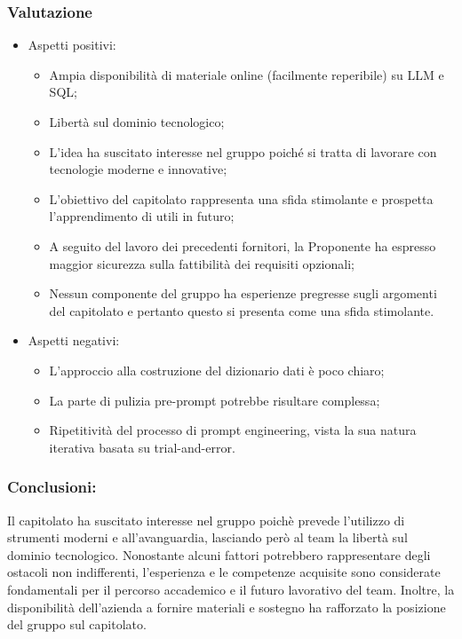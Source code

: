 \subsubsection{Valutazione}
\begin{itemize}
  \item Aspetti positivi:
  \begin{itemize}
    \item Ampia disponibilità di materiale online (facilmente reperibile) su LLM e SQL;
    \item Libertà sul dominio tecnologico;
    \item L’idea ha suscitato interesse nel gruppo poiché si tratta di lavorare con tecnologie moderne e innovative;
    \item L’obiettivo del capitolato rappresenta una sfida stimolante e prospetta l’apprendimento di  utili in futuro;
    \item A seguito del lavoro dei precedenti fornitori, la Proponente ha espresso maggior sicurezza sulla fattibilità dei requisiti opzionali;
    \item Nessun componente del gruppo ha esperienze pregresse sugli argomenti del capitolato e pertanto questo si presenta come una sfida stimolante.
  \end{itemize}
  \item Aspetti negativi:
  \begin{itemize}
    \item L’approccio alla costruzione del dizionario dati è poco chiaro;
    \item La parte di pulizia pre-prompt potrebbe risultare complessa;
    \item Ripetitività del processo di prompt engineering, vista la sua natura iterativa basata su trial-and-error.
  \end{itemize}
\end{itemize}

\subsubsection{Conclusioni:}
Il capitolato ha suscitato interesse nel gruppo poichè prevede l'utilizzo di strumenti moderni e all'avanguardia, lasciando però al team la libertà sul dominio tecnologico. Nonostante alcuni fattori potrebbero rappresentare degli ostacoli non indifferenti, l'esperienza e le competenze acquisite sono considerate fondamentali per il percorso accademico e il futuro lavorativo del team. Inoltre, la disponibilità dell'azienda a fornire materiali e sostegno ha rafforzato la posizione del gruppo sul capitolato.

